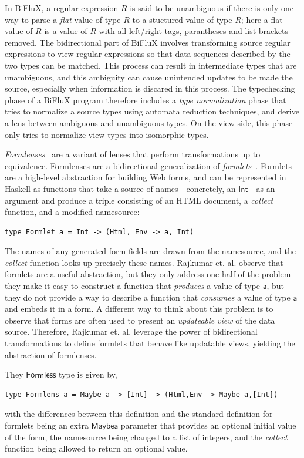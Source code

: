 \documentclass[acmsmall,review,anonymous]{acmart}
\newcommand{\codefont}[1]{\ensuremath{\mathsf{#1}}}
\newcommand{\kw}[1]{\codefont{#1}}
\begin{document}
In BiFluX, a regular expression $R$ is said to be unambiguous if there is only
one way to parse a {\em flat} value of type $R$ to a stuctured value of type
$R$; here a flat value of $R$ is a value of $R$ with all left/right tags,
parantheses and list brackets removed. The bidirectional part of BiFluX involves
transforming source regular expressions to view regular expressions so that
data sequences described by the two types can be matched. This process can
result in intermediate types that are unambiguous, and this ambiguity can cause
unintended updates to be made the source, especially when information is
discared in this process. The typechecking phase of a BiFluX program therefore
includes a {\em type normalization} phase that tries to normalize a source types
using automata reduction techniques, and derive a lens between ambiguous and
unambiguous types. On the view side, this phase only tries to normalize view
types into isomorphic types.

{\em Formlenses}~\cite{rajkumar2014lenses} are a variant of lenses that perform
transformations up to equivalence. Formlenses are a bidirectional generalization
of {\em formlets}~\cite{cooper2008essence}. Formlets are a high-level
abstraction for building Web forms, and can be represented in Haskell as
functions that take a source of names---concretely, an \kw{Int}---as an
argument and produce a triple consisting of an HTML document, a {\em collect}
function, and a modified namesource:
\begin{center}
\begin{lstlisting}
type Formlet a = Int -> (Html, Env -> a, Int)
\end{lstlisting}
\end{center}
The names of any generated form fields are drawn from the namesource, and the
{\em collect} function looks up precisely these names.
Rajkumar et. al. observe that formlets are a useful
abstraction, but they only address one half of the problem---they make it easy
to construct a function that {\em produces} a value of type \kw{a}, but they do
not provide a way to describe a function that {\em consumes} a value of type
\kw{a} and embeds it in a form. A different way to think about this problem is
to observe that forms are often used to present an {\em updateable view} of the
data source. Therefore, Rajkumar et. al. leverage the power of bidirectional
transformations to define formlets that behave like updatable views, yielding
the abstraction of formlenses.

They \kw{Formless} type is given by,
\begin{center}
\begin{lstlisting}
type Formlens a = Maybe a -> [Int] -> (Html,Env -> Maybe a,[Int])
\end{lstlisting}
\end{center}
with the differences between this definition and the standard definition for
formlets being an extra \kw{Maybe a} parameter that provides an optional initial
value of the form, the namesource being changed to a list of integers, and the
{\em collect} function being allowed to return an optional value.
\end{document}
